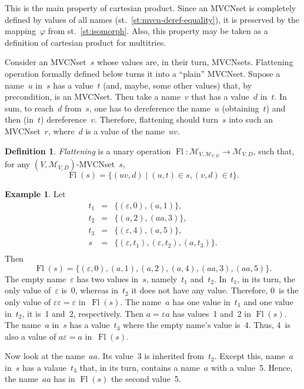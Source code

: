 \documentclass{article}
\theoremstyle{definition}
\newtheorem{Df}{Definition}
\newtheorem{Ex}{Example}
\newcommand{\setcharmvcn}{M}
\newcommand{\setsymbol}[3]{\mathcal{#1}_{#2,#3}}
\newcommand{\setmvcn}[2]{\setsymbol{\setcharmvcn}{#1}{#2}}
\newcommand{\flatten}{\operatorname{Fl}}
\begin{document}
This is the main property of cartesian product. Since an MVCNset is
completely defined by values of all names (st.~\ref{st:mvcn-deref-equality}),
it is preserved by the mapping~$\varphi$ from st.~\ref{st:isomorph}. Also, this
property may be taken as a definition of cartesian product for multitries.

Consider an MVCNset~$s$ whose values are, in their turn, MVCNsets.  Flattening
operation formally defined below turns it into a ``plain'' MVCNset.  Supose a
name~$u$ in~$s$ has a value~$t$ (and, maybe, some other values) that, by
precondition, is an MVCNset.  Then take a name~$v$ that has a value~$d$ in~$t$.
In sum, to reach~$d$ from~$s$, one has to dereference the name~$u$
(obtaining~$t$) and then (in~$t$) dereference~$v$. Therefore, flattening should
turn~$s$ into such an MVCNset~$r$, where~$d$ is a value of the name~$uv$.

\begin{Df}\label{df:flatten}
\emph{Flattening} is a unary operation
$\flatten : \setmvcn{V}{\setmvcn{V}{D}} \to\setmvcn{V}{D}$,
such that, for any $(V,\setmvcn{V}{D})$-MVCNset~$s$,
\[
  \flatten(s) = \{ (uv, d) \mid (u, t) \in s, (v, d) \in t \} .
\]
\end{Df}

\begin{Ex}\label{ex:flatten}
Let
\begin{eqnarray*}
  t_1 & = & \{ (\varepsilon, 0), (a, 1) \} ,\\
  t_2 & = & \{ (a, 2), (aa, 3) \} ,\\
  t_3 & = & \{ (\varepsilon, 4), (a, 5) \} ,\\
  s   & = & \{ (\varepsilon, t_1), (\varepsilon, t_2), (a, t_3) \} .\\
\end{eqnarray*}
Then
\[
  \flatten(s) = \{
      (\varepsilon, 0), (a, 1), (a, 2), (a, 4), (aa, 3), (aa, 5)
  \} .
\]
The empty name~$\varepsilon$ has two values in~$s$, namely~$t_1$ and~$t_2$.
In~$t_1$, in its turn, the only value of~$\varepsilon$ is~0, whereas in~$t_2$
it does not have any value. Therefore, 0~is the only value of $\varepsilon
\varepsilon = \varepsilon$ in~$\flatten(s)$.  The name~$a$ has one value in~$t_1$
and one value in~$t_2$, it is~1 and~2, respectively.  Then $a = \varepsilon a$
has values~1 and~2 in $\flatten(s)$.  The name~$a$ in~$s$ has a value~$t_3$
where the empty name's value is~4. Thus, 4~is also a value of $a \varepsilon =
a$ in~$\flatten(s)$.

Now look at the name~$aa$. Its value~3 is inherited from~$t_2$. Except this,
name~$a$ in~$s$ has a valaue~$t_3$ that, in its turn, contains a name~$a$ with
a value~5. Hence, the name~$aa$ has in $\flatten(s)$ the second value~5.
\end{Ex}
\end{document}
